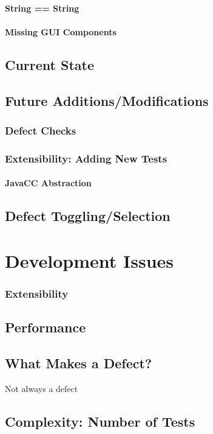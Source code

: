 \paragraph{String == String}
\paragraph{Missing GUI Components}
\subsection{Current State}
\subsection{Future Additions/Modifications}
\subsubsection{Defect Checks}
\subsubsection{Extensibility: Adding New Tests}
\paragraph{JavaCC Abstraction}
\subsection{Defect Toggling/Selection}

\section{Development Issues}
\subsubsection{Extensibility}
\subsection{Performance}
\subsection{What Makes a Defect?} Not always a defect
\subsection{Complexity: Number of Tests}

